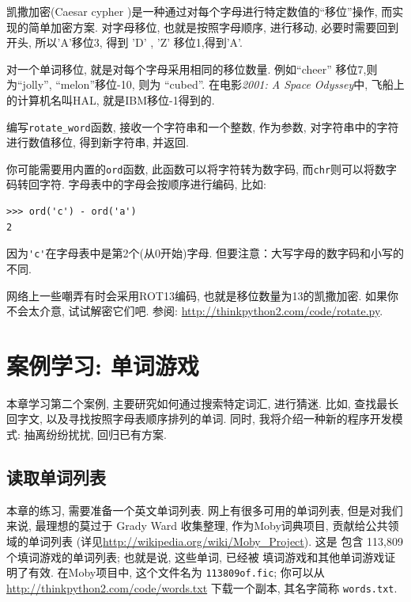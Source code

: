 \documentclass[10pt]{book}
\begin{document}
\begin{exercise}

\label{exrotate}
凯撒加密(Caesar cypher )是一种通过对每个字母进行特定数值的``移位''操作, 
而实现的简单加密方案. 
对字母移位, 也就是按照字母顺序, 进行移动, 必要时需要回到开头,  
所以'A'移位3, 得到 'D' ,   'Z' 移位1,得到'A'. 

对一个单词移位, 就是对每个字母采用相同的移位数量. 
例如``cheer'' 移位7,则为``jolly'',  ``melon''移位-10, 则为 ``cubed''. 
在电影{\em 2001: A Space Odyssey}中, 飞船上的计算机名叫HAL, 
就是IBM移位-1得到的. 


编写\verb"rotate_word"函数, 接收一个字符串和一个整数, 作为参数, 
对字符串中的字符进行数值移位, 得到新字符串, 并返回. 

你可能需要用内置的{\tt ord}函数, 此函数可以将字符转为数字码, 
而{\tt chr}则可以将数字码转回字符. 
字母表中的字母会按顺序进行编码, 比如:

\begin{verbatim}
>>> ord('c') - ord('a')
2
\end{verbatim}
因为\verb"'c'"在字母表中是第2个(从0开始)字母. 
但要注意：大写字母的数字码和小写的不同. 

网络上一些嘲弄有时会采用ROT13编码, 也就是移位数量为13的凯撒加密. 
如果你不会太介意, 试试解密它们吧. 参阅:
\url{http://thinkpython2.com/code/rotate.py}.

\end{exercise}


\chapter{案例学习: 单词游戏}
\label{wordplay}

本章学习第二个案例, 主要研究如何通过搜索特定词汇, 进行猜迷. 
比如, 查找最长回字文, 以及寻找按照字母表顺序排列的单词. 
同时, 我将介绍一种新的程序开发模式: 抽离纷纷扰扰, 回归已有方案. 


\section{读取单词列表}
\label{wordlist}
本章的练习, 需要准备一个英文单词列表. 
网上有很多可用的单词列表, 但是对我们来说, 最理想的莫过于
Grady Ward 收集整理, 作为Moby词典项目, 贡献给公共领域的单词列表
(详见\url{http://wikipedia.org/wiki/Moby_Project}). 这是
包含 113,809 个填词游戏的单词列表; 也就是说, 这些单词, 已经被
填词游戏和其他单词游戏证明了有效. 
在Moby项目中, 这个文件名为 {\tt 113809of.fic};
你可以从\url{http://thinkpython2.com/code/words.txt} 下载一个副本, 
其名字简称 {\tt words.txt}. 
\end{document}
